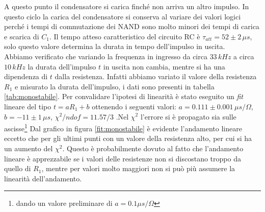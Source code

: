 \documentclass[10pt,a4paper]{article}
\begin{document}
A questo punto il condensatore si carica finché non arriva un altro impulso. In questo ciclo la carica del condensatore si conserva al variare dei valori logici perché i tempi di commutazione dei NAND sono molto minori dei tempi di carica e scarica di $C_1$. Il tempo atteso caratteristico del circuito RC è $\tau_{att}=52\pm2\,\mu s$, solo questo valore determina la durata in tempo dell'impulso in uscita.\\
Abbiamo verificato che variando la frequenza in ingresso da circa $33\,kHz$ a circa $10\,kHz$ la durata dell'impulso $t$ in uscita non cambia, mentre si ha una dipendenza di $t$ dalla resistenza. Infatti abbiamo variato il valore della resistenza $R_1$ e misurato la durata dell'impulso, i dati sono presenti in tabella \ref{tab:monostabile}. Per convalidare l'ipotesi di linearità è stato eseguito un \emph{fit} lineare del tipo $t=aR_1+b$ ottenendo i seguenti valori: $a=0.111\pm0.001\,\mu s/\Omega$, $b= -11\pm1\,\mu s$, $\chi^2/ndof=11.57/3$ .Nel $\chi^2$ l'errore si è propagato sia sulle ascisse\footnote{dando un valore preliminare di $a = 0.1 \mu s/\Omega$} Dal grafico in figura \ref{fit:monostabile} è evidente l'andamento lineare eccetto che per gli ultimi punti con un valore della resistenza alto, per cui si ha un aumento del $\chi^2$. Questo è probabilmente dovuto al fatto che l'andamento lineare è apprezzabile se i valori delle resistenze non si discostano troppo da quello di $R_1$, mentre per valori molto maggiori non si può più assumere la linearità dell'andamento.




\end{document}
